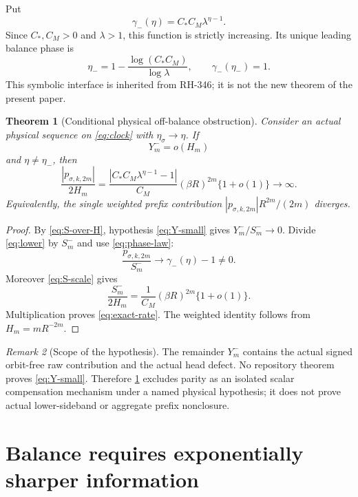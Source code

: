 \documentclass[11pt]{article}
\newtheorem{theorem}{Theorem}[section]
\theoremstyle{remark}
\newtheorem{remark}[theorem]{Remark}
\begin{document}
Put
\begin{equation}\label{eq:gamma}
 \gamma_-(\eta)=C_*C_M\lambda^{\eta-1}.
\end{equation}
Since $C_*,C_M>0$ and $\lambda>1$, this function is strictly increasing.
Its unique leading balance phase is
\begin{equation}\label{eq:eta-minus}
 \boxed{\eta_-=1-\frac{\log(C_*C_M)}{\log\lambda}},
 \qquad \gamma_-(\eta_-)=1.
\end{equation}
This symbolic interface is inherited from RH-346; it is not the new theorem
of the present paper.

\begin{theorem}[Conditional physical off-balance obstruction]
\label{thm:off-balance}
Consider an actual physical sequence on \eqref{eq:clock} with
$\eta_\sigma\to\eta$.  If
\begin{equation}\label{eq:Y-small}
 Y_m^-=o(H_m)
\end{equation}
and $\eta\ne\eta_-$, then
\begin{equation}\label{eq:exact-rate}
 \boxed{
 \frac{|p_{\sigma,k,2m}|}{2H_m}
 =\frac{|C_*C_M\lambda^{\eta-1}-1|}{C_M}
  (\beta R)^{2m}\{1+o(1)\}
 \longrightarrow\infty.}
\end{equation}
Equivalently, the single weighted prefix contribution
$|p_{\sigma,k,2m}|R^{2m}/(2m)$ diverges.
\end{theorem}

\begin{proof}
By \eqref{eq:S-over-H}, hypothesis \eqref{eq:Y-small} gives
$Y_m^-/S_m^-\to0$.  Divide \eqref{eq:lower} by $S_m^-$ and use
\eqref{eq:phase-law}:
\[
 \frac{p_{\sigma,k,2m}}{S_m^-}
 \longrightarrow \gamma_-(\eta)-1\ne0.
\]
Moreover \eqref{eq:S-scale} gives
\[
 \frac{S_m^-}{2H_m}
 =\frac1{C_M}(\beta R)^{2m}\{1+o(1)\}.
\]
Multiplication proves \eqref{eq:exact-rate}.  The weighted identity follows
from $H_m=mR^{-2m}$.
\end{proof}

\begin{remark}[Scope of the hypothesis]
The remainder $Y_m^-$ contains the actual signed orbit-free raw contribution
and the actual head defect.  No repository theorem proves
\eqref{eq:Y-small}.  Therefore \cref{thm:off-balance} excludes parity as an
isolated scalar compensation mechanism under a named physical hypothesis;
it does not prove actual lower-sideband or aggregate prefix nonclosure.
\end{remark}

\section{Balance requires exponentially sharper information}
\end{document}
